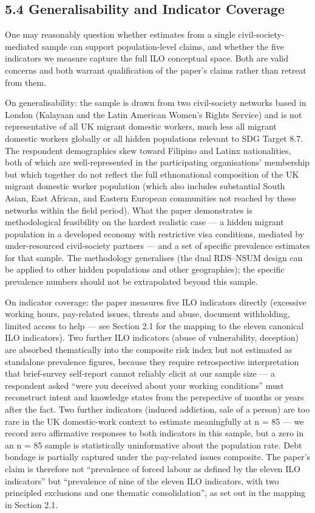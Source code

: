 \documentclass[
  12pt,
  letterpaper,
  DIV=11,
  numbers=noendperiod]{scrartcl}
\begin{document}
\subsection{5.4 Generalisability and Indicator
Coverage}\label{generalisability-and-indicator-coverage}

One may reasonably question whether estimates from a single
civil-society-mediated sample can support population-level claims, and
whether the five indicators we measure capture the full ILO conceptual
space. Both are valid concerns and both warrant qualification of the
paper's claims rather than retreat from them.

On generalisability: the sample is drawn from two civil-society networks
based in London (Kalayaan and the Latin American Women's Rights Service)
and is not representative of all UK migrant domestic workers, much less
all migrant domestic workers globally or all hidden populations relevant
to SDG Target 8.7. The respondent demographics skew toward Filipino and
Latinx nationalities, both of which are well-represented in the
participating organisations' membership but which together do not
reflect the full ethnonational composition of the UK migrant domestic
worker population (which also includes substantial South Asian, East
African, and Eastern European communities not reached by these networks
within the field period). What the paper demonstrates is methodological
feasibility on the hardest realistic case --- a hidden migrant
population in a developed economy with restrictive visa conditions,
mediated by under-resourced civil-society partners --- and a set of
specific prevalence estimates for that sample. The methodology
generalises (the dual RDS--NSUM design can be applied to other hidden
populations and other geographies); the specific prevalence numbers
should not be extrapolated beyond this sample.

On indicator coverage: the paper measures five ILO indicators directly
(excessive working hours, pay-related issues, threats and abuse,
document withholding, limited access to help --- see Section 2.1 for the
mapping to the eleven canonical ILO indicators). Two further ILO
indicators (abuse of vulnerability, deception) are absorbed thematically
into the composite risk index but not estimated as standalone prevalence
figures, because they require retrospective interpretation that
brief-survey self-report cannot reliably elicit at our sample size --- a
respondent asked ``were you deceived about your working conditions''
must reconstruct intent and knowledge states from the perspective of
months or years after the fact. Two further indicators (induced
addiction, sale of a person) are too rare in the UK domestic-work
context to estimate meaningfully at n = 85 --- we record zero
affirmative responses to both indicators in this sample, but a zero in
an n = 85 sample is statistically uninformative about the population
rate. Debt bondage is partially captured under the pay-related issues
composite. The paper's claim is therefore not ``prevalence of forced
labour as defined by the eleven ILO indicators'' but ``prevalence of
nine of the eleven ILO indicators, with two principled exclusions and
one thematic consolidation'', as set out in the mapping in Section 2.1.
\end{document}

